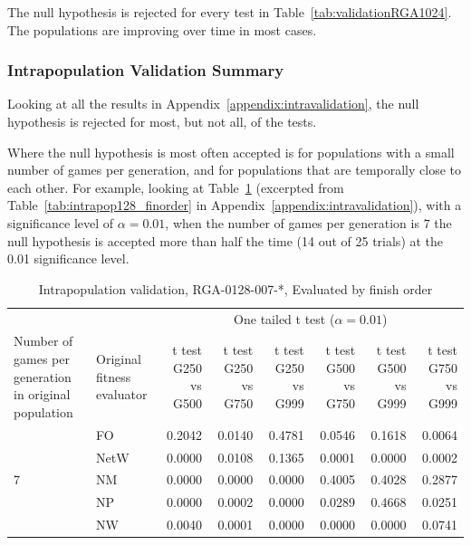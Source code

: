 The null hypothesis is rejected for every test in
Table~\ref{tab:validationRGA1024}. The populations are improving over time in
most cases.

\subsubsection{Intrapopulation Validation Summary}

Looking at all the results in Appendix~\ref{appendix:intravalidation}, 
the null hypothesis is rejected for most, but not all, of the tests.

Where the null hypothesis is most often accepted is for populations with a small
number of games per generation, and for populations that are temporally close to
each other. For example, looking at Table~\ref{tab:validationRGA0128-007}
(excerpted from Table~\ref{tab:intrapop128_finorder} in
Appendix~\ref{appendix:intravalidation}), with a significance level of
\(\alpha=0.01\), when the number of games per generation is 7 the null
hypothesis is accepted more than half the time (14 out of 25 trials) at the 0.01
significance level.

\begin{table}[htbp]
  \centering
  \caption{Intrapopulation validation, RGA-0128-007-*, Evaluated by finish order}
    \begin{tabularx}{\linewidth}{|p{1in}|p{1in}|r|r|r|r|r|r|}
    \cline{3-8}
    \multicolumn{1}{l}{} &  & \multicolumn{6}{c|}{One tailed t test (\(\alpha=0.01\))} \\
    \cline{1-8}
      Number of games per generation in original population
    & Original fitness evaluator
    & \multicolumn{1}{X|}{t test G250 vs G500} 
    & \multicolumn{1}{X|}{t test G250 vs G750} 
    & \multicolumn{1}{X|}{t test G250 vs G999} 
    & \multicolumn{1}{X|}{t test G500 vs G750} 
    & \multicolumn{1}{X|}{t test G500 vs G999} 
    & \multicolumn{1}{X|}{t test G750 vs G999} \\
    \cline{1-8}
    \multirow{5}{*}{7} 
      & FO & 0.2042 & 0.0140 & 0.4781 & 0.0546 & 0.1618 & 0.0064 \\
\cline{2-8}             
      & NetW & 0.0000 & 0.0108 & 0.1365 & 0.0001 & 0.0000 & 0.0002 \\
\cline{2-8}             
      & NM & 0.0000 & 0.0000 & 0.0000 & 0.4005 & 0.4028 & 0.2877 \\
\cline{2-8}             
      & NP & 0.0000 & 0.0002 & 0.0000 & 0.0289 & 0.4668 & 0.0251 \\
\cline{2-8}             
      & NW & 0.0040 & 0.0001 & 0.0000 & 0.0000 & 0.0000 & 0.0741 \\
    \cline{1-8}
    \end{tabularx}%
  \label{tab:validationRGA0128-007}%
\end{table}%

